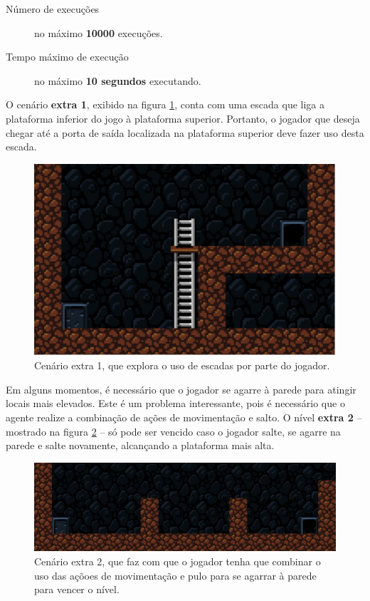 \begin{description}
    \item [Número de execuções] no máximo \textbf{10000} execuções.
    \item [Tempo máximo de execução] no máximo \textbf{10 segundos} executando.
\end{description}

O cenário \textbf{extra 1}, exibido na figura \ref{fig:extra1}, conta com uma
escada que liga a plataforma inferior do jogo à plataforma superior. Portanto,
o jogador que deseja chegar até a porta de saída localizada na plataforma
superior deve fazer uso desta escada.

\begin{figure}[H]
\centering
\includegraphics[width=\textwidth / 2]{fig/levels/extra1.pdf}
\caption{Cenário extra 1, que explora o uso de escadas por parte do jogador.}
\label{fig:extra1}
\end{figure}

Em alguns momentos, é necessário que o jogador se agarre à parede para atingir
locais mais elevados. Este é um problema interessante, pois é necessário que o
agente realize a combinação de ações de movimentação e salto. O nível
\textbf{extra 2} -- mostrado na figura \ref{fig:extra2} -- só pode ser vencido
caso o jogador salte, se agarre na parede e salte novamente, alcançando a
plataforma mais alta.

\begin{figure}[H]
\centering
\includegraphics[width=\textwidth / 2]{fig/levels/extra2.pdf}
\caption{Cenário extra 2, que faz com que o jogador tenha que combinar o uso das
açõoes de movimentação e pulo para se agarrar à parede para vencer o nível.}
\label{fig:extra2}
\end{figure}


